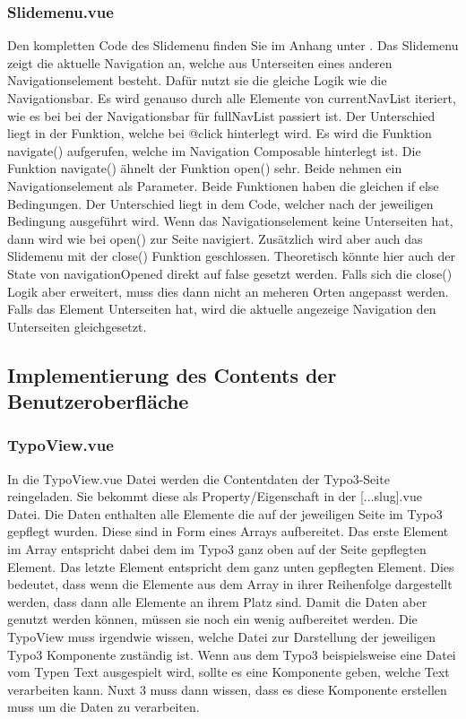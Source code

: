 \subsubsection{Slidemenu.vue}
\label{sec:Slidemenu.vue}

Den kompletten Code des Slidemenu finden Sie im Anhang unter .
Das Slidemenu zeigt die aktuelle Navigation an, welche aus Unterseiten eines anderen Navigationselement besteht. Dafür nutzt sie die gleiche Logik wie die Navigationsbar. Es wird genauso durch alle Elemente von currentNavList iteriert, wie es bei bei der Navigationsbar für fullNavList passiert ist. Der Unterschied liegt in der Funktion, welche bei @click hinterlegt wird. Es wird die Funktion navigate() aufgerufen, welche im Navigation Composable hinterlegt ist. Die Funktion navigate() ähnelt der Funktion open() sehr. Beide nehmen ein Navigationselement als Parameter. Beide Funktionen haben die gleichen if else Bedingungen. Der Unterschied liegt in dem Code, welcher nach der jeweiligen Bedingung ausgeführt wird. Wenn das Navigationselement keine Unterseiten hat, dann wird wie bei open() zur Seite navigiert. Zusätzlich wird aber auch das Slidemenu mit der close() Funktion geschlossen. Theoretisch könnte hier auch der State von navigationOpened direkt auf false gesetzt werden. Falls sich die close() Logik aber erweitert, muss dies dann nicht an meheren Orten angepasst werden. Falls das Element Unterseiten hat, wird die aktuelle angezeige Navigation den Unterseiten gleichgesetzt. 

\subsection{Implementierung des Contents der Benutzeroberfläche}
\label{sec:Implementierung des Contents der ImplementierungBenutzeroberflaeche}

\subsubsection{TypoView.vue}
\label{sec:TypoView.vue}

In die TypoView.vue Datei werden die Contentdaten der Typo3-Seite reingeladen. Sie bekommt diese als Property/Eigenschaft in der [...slug].vue Datei. Die Daten enthalten alle Elemente die auf der jeweiligen Seite im Typo3 gepflegt wurden. Diese sind in Form eines Arrays aufbereitet. Das erste Element im Array entspricht dabei dem im Typo3 ganz oben auf der Seite gepflegten Element. Das letzte Element entspricht dem ganz unten gepflegten Element. Dies bedeutet, dass wenn die Elemente aus dem Array in ihrer Reihenfolge dargestellt werden, dass dann alle Elemente an ihrem Platz sind. Damit die Daten aber genutzt werden können, müssen sie noch ein wenig aufbereitet werden. Die TypoView muss irgendwie wissen, welche Datei zur Darstellung der jeweiligen Typo3 Komponente zuständig ist. Wenn aus dem Typo3 beispielsweise eine Datei vom Typen Text ausgespielt wird, sollte es eine Komponente geben, welche Text verarbeiten kann. Nuxt 3 muss dann wissen, dass es diese Komponente erstellen muss um die Daten zu verarbeiten.

